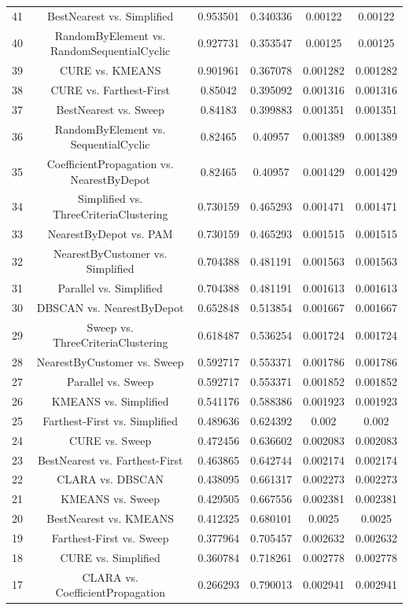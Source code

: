 \documentclass[a4paper,10pt]{article}
\begin{document}
\begin{landscape}
\begin{table}[!htp]
\begin{tabular}{cccccc}
41&BestNearest vs. Simplified&0.953501&0.340336&0.00122&0.00122\\
40&RandomByElement vs. RandomSequentialCyclic&0.927731&0.353547&0.00125&0.00125\\
39&CURE vs. KMEANS&0.901961&0.367078&0.001282&0.001282\\
38&CURE vs. Farthest-First&0.85042&0.395092&0.001316&0.001316\\
37&BestNearest vs. Sweep&0.84183&0.399883&0.001351&0.001351\\
36&RandomByElement vs. SequentialCyclic&0.82465&0.40957&0.001389&0.001389\\
35&CoefficientPropagation vs. NearestByDepot&0.82465&0.40957&0.001429&0.001429\\
34&Simplified vs. ThreeCriteriaClustering&0.730159&0.465293&0.001471&0.001471\\
33&NearestByDepot vs. PAM&0.730159&0.465293&0.001515&0.001515\\
32&NearestByCustomer vs. Simplified&0.704388&0.481191&0.001563&0.001563\\
31&Parallel vs. Simplified&0.704388&0.481191&0.001613&0.001613\\
30&DBSCAN vs. NearestByDepot&0.652848&0.513854&0.001667&0.001667\\
29&Sweep vs. ThreeCriteriaClustering&0.618487&0.536254&0.001724&0.001724\\
28&NearestByCustomer vs. Sweep&0.592717&0.553371&0.001786&0.001786\\
27&Parallel vs. Sweep&0.592717&0.553371&0.001852&0.001852\\
26&KMEANS vs. Simplified&0.541176&0.588386&0.001923&0.001923\\
25&Farthest-First vs. Simplified&0.489636&0.624392&0.002&0.002\\
24&CURE vs. Sweep&0.472456&0.636602&0.002083&0.002083\\
23&BestNearest vs. Farthest-First&0.463865&0.642744&0.002174&0.002174\\
22&CLARA vs. DBSCAN&0.438095&0.661317&0.002273&0.002273\\
21&KMEANS vs. Sweep&0.429505&0.667556&0.002381&0.002381\\
20&BestNearest vs. KMEANS&0.412325&0.680101&0.0025&0.0025\\
19&Farthest-First vs. Sweep&0.377964&0.705457&0.002632&0.002632\\
18&CURE vs. Simplified&0.360784&0.718261&0.002778&0.002778\\
17&CLARA vs. CoefficientPropagation&0.266293&0.790013&0.002941&0.002941\\

\end{tabular}
\end{table}
\end{landscape}
\end{document}
